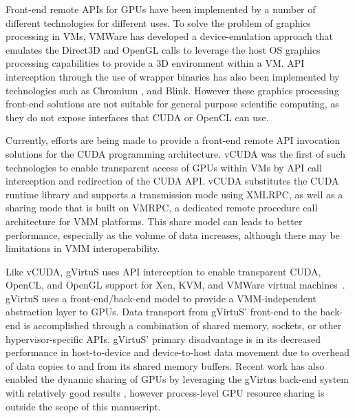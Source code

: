 Front-end remote APIs for GPUs have been implemented by a number of different technologies for different uses. To solve the problem of graphics processing in VMs, VMWare \cite{vmwaregpu} has developed a device-emulation approach that emulates the Direct3D and OpenGL calls to leverage the host OS graphics processing capabilities to provide a 3D environment within a VM. API interception through the use of wrapper binaries has also been implemented by technologies such as Chromium \cite{humphreys2002chromium}, and Blink. However these graphics processing front-end solutions are not suitable for general purpose scientific computing, as they do not expose interfaces that CUDA or OpenCL can use. 

Currently, efforts are being made to provide a front-end remote API invocation solutions for the CUDA programming architecture.  vCUDA \cite{shi2012vcuda} was the first of such technologies to enable transparent access of GPUs within VMs by API call interception and redirection of the CUDA API. vCUDA substitutes the CUDA runtime library and supports a transmission mode using XMLRPC, as well as a sharing mode that is built on VMRPC, a dedicated remote procedure call architecture for VMM platforms. This share model can leads to better performance, especially as the volume of data increases, although there may be limitations in VMM interoperability. 

Like vCUDA, gVirtuS uses API interception to enable transparent CUDA, OpenCL, and OpenGL support for Xen, KVM, and VMWare virtual machines~\cite{gvirtus}.  gVirtuS uses a front-end/back-end model to provide a VMM-independent abstraction layer to GPUs.  Data transport from gVirtuS' front-end to the back-end is accomplished through a combination of shared memory, sockets, or other hypervisor-specific APIs.  gVirtuS' primary disadvantage is in its decreased performance in host-to-device and device-to-host data movement due to overhead of data copies to and from its shared memory buffers. Recent work has also enabled the dynamic sharing of GPUs by leveraging the gVirtus back-end system with relatively good results \cite{gCloud}, however process-level GPU resource sharing is outside the scope of this manuscript.


